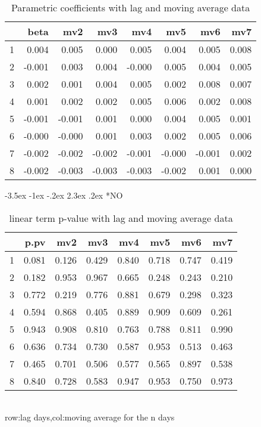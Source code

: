 \documentclass[a4paper, 12pt]{article}
\makeatletter
\def\large{\fontsize{14}{20}\selectfont}
\renewcommand\subsection{\@startsection {subsection}{1}{\z@}%
                                   {-3.5ex \@plus -1ex \@minus -.2ex}%
                                   {2.3ex \@plus.2ex}%
                                   {\centering\normalfont\large\bfseries}}
\makeatother
\begin{document}
\begin{table}[h]
\centering
\caption{Parametric coefficients with lag and moving average data}
\begin{tabular}{rrrrrrrr}
  \hline
 & beta & mv2 & mv3 & mv4 & mv5 & mv6 & mv7 \\
  \hline
1 & 0.004 & 0.005 & 0.000 & 0.005 & 0.004 & 0.005 & 0.008 \\
  2 & -0.001 & 0.003 & 0.004 & -0.000 & 0.005 & 0.004 & 0.005 \\
  3 & 0.002 & 0.001 & 0.004 & 0.005 & 0.002 & 0.008 & 0.007 \\
  4 & 0.001 & 0.002 & 0.002 & 0.005 & 0.006 & 0.002 & 0.008 \\
  5 & -0.001 & -0.001 & 0.001 & 0.000 & 0.004 & 0.005 & 0.001 \\
  6 & -0.000 & -0.000 & 0.001 & 0.003 & 0.002 & 0.005 & 0.006 \\
  7 & -0.002 & -0.002 & -0.002 & -0.001 & -0.000 & -0.001 & 0.002 \\
  8 & -0.002 & -0.003 & -0.003 & -0.003 & -0.002 & 0.001 & 0.000 \\
   \hline
\end{tabular}
\end{table}
\clearpage
\subsection*{NO}
\begin{table}[h]
\centering
\caption{linear term p-value with lag and moving average data}
\begin{tabular}{rrrrrrrr}
  \hline
 & p.pv & mv2 & mv3 & mv4 & mv5 & mv6 & mv7 \\
  \hline
1 & 0.081 & 0.126 & 0.429 & 0.840 & 0.718 & 0.747 & 0.419 \\
  2 & 0.182 & 0.953 & 0.967 & 0.665 & 0.248 & 0.243 & 0.210 \\
  3 & 0.772 & 0.219 & 0.776 & 0.881 & 0.679 & 0.298 & 0.323 \\
  4 & 0.594 & 0.868 & 0.405 & 0.889 & 0.909 & 0.609 & 0.261 \\
  5 & 0.943 & 0.908 & 0.810 & 0.763 & 0.788 & 0.811 & 0.990 \\
  6 & 0.636 & 0.734 & 0.730 & 0.587 & 0.953 & 0.513 & 0.463 \\
  7 & 0.465 & 0.701 & 0.506 & 0.577 & 0.565 & 0.897 & 0.538 \\
  8 & 0.840 & 0.728 & 0.583 & 0.947 & 0.953 & 0.750 & 0.973 \\
   \hline
\end{tabular}
\\row:lag days,col:moving average for the n days
\end{table}
\end{document}
